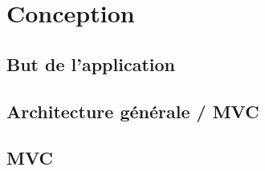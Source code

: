 
\section{Conception}

\subsection{But de l'application}

\subsection{Architecture générale / MVC}


\subsection{MVC}


